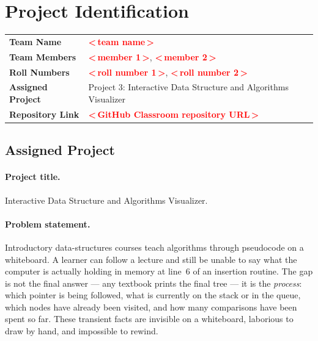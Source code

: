 \documentclass[11pt,a4paper]{article}
\newcommand{\fillme}[1]{\textcolor{red}{\textbf{<\,#1\,>}}}
\renewcommand{\arraystretch}{1.12}
\begin{document}
\section{Project Identification}

\begin{center}
\renewcommand{\arraystretch}{1.3}
\begin{tabular}{@{}L{4.2cm}L{10.4cm}@{}}
\toprule
\textbf{Team Name} & \fillme{team name} \\
\textbf{Team Members} & \fillme{member 1}, \fillme{member 2} \\
\textbf{Roll Numbers} & \fillme{roll number 1}, \fillme{roll number 2} \\
\textbf{Assigned Project} & Project 3: Interactive Data Structure and Algorithms Visualizer \\
\textbf{Repository Link} & \fillme{GitHub Classroom repository URL} \\
\bottomrule
\end{tabular}
\end{center}

\subsection{Assigned Project}

\paragraph{Project title.} Interactive Data Structure and Algorithms Visualizer.

\paragraph{Problem statement.} Introductory data-structures courses teach algorithms
through pseudocode on a whiteboard. A learner can follow a lecture and still be unable to
say what the computer is actually holding in memory at line~6 of an insertion routine. The
gap is not the final answer --- any textbook prints the final tree --- it is the
\emph{process}: which pointer is being followed, what is currently on the stack or in the
queue, which nodes have already been visited, and how many comparisons have been spent so
far. These transient facts are invisible on a whiteboard, laborious to draw by hand, and
impossible to rewind.
\end{document}
